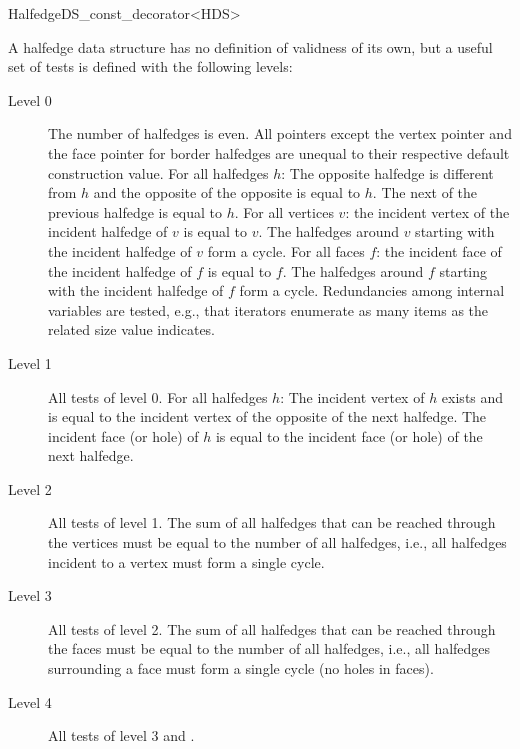\begin{ccRefClass}{HalfedgeDS_const_decorator<HDS>}

A halfedge data structure has no definition of validness of its own,
but a useful set of tests is defined with the following levels:
%
\begin{description}
\item[Level 0] 
  The number of halfedges is even. All pointers except
  the vertex pointer and the face pointer for border halfedges are
  unequal to their respective default construction value.  For all
  halfedges $h$: The opposite halfedge is different from $h$ and the
  opposite of the opposite is equal to $h$. The next of the previous
  halfedge is equal to $h$. For all vertices $v$: the incident vertex
  of the incident halfedge of $v$ is equal to $v$. The halfedges
  around $v$ starting with the incident halfedge of $v$ form a cycle.
  For all faces $f$: the incident face of the incident halfedge of $f$
  is equal to $f$. The halfedges around $f$ starting with the incident
  halfedge of $f$ form a cycle.  Redundancies among internal variables
  are tested, e.g., that iterators enumerate as many items as the
  related size value indicates.
\item[Level 1] 
  All tests of level 0. For all halfedges $h$: The
  incident vertex of $h$ exists and is equal to the incident vertex of
  the opposite of the next halfedge. The incident face (or hole) of
  $h$ is equal to the incident face (or hole) of the next halfedge.
\item[Level 2]
  All tests of level 1. The sum of all halfedges that can
  be reached through the vertices must be equal to the number of all
  halfedges, i.e., all halfedges incident to a vertex must form a single
  cycle.
\item[Level 3]
  All tests of level 2. The sum of all halfedges that can
  be reached through the faces must be equal to the number of all
  halfedges, i.e., all halfedges surrounding a face must form a single
  cycle (no holes in faces).
\item[Level 4]
  All tests of level 3 and .
\end{description}



\end{ccRefClass}
